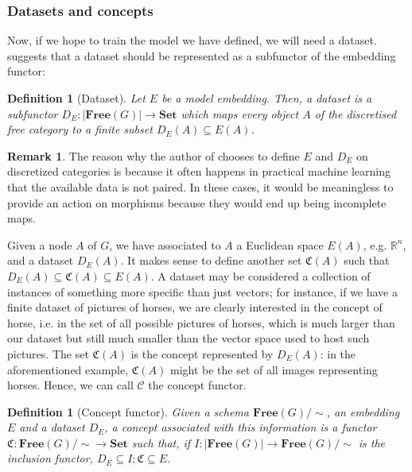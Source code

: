 \documentclass[12pt,a4paper,openright,twoside]{report}
\theoremstyle{plain}
\newtheorem{definition}[proposition]{Definition}
\theoremstyle{definition}
\newtheorem{remark}[proposition]{Remark}
\begin{document}
\subsubsection{Datasets and concepts}

Now, if we hope to train the model we have defined, we will need a dataset. \cite{gavranovic2019compositional} suggests that a dataset should be represented as a subfunctor of the embedding functor:

\begin{definition}[Dataset]
  Let $E$ be a model embedding. Then, a dataset is a subfunctor $D_E: |\mathbf{Free}(G)| \to \mathbf{Set}$ which maps every object $A$ of the discretised free category to a finite subset $D_E(A) \subseteq E(A)$.
\end{definition}

\begin{remark}
  The reason why the author of \cite{gavranovic2019compositional} chooses to define $E$ and $D_E$ on discretized categories is because it often happens in practical machine learning that the available data is not paired. In these cases, it would be meaningless to provide an action on morphisms because they would end up being incomplete maps.
\end{remark}

Given a node $A$ of $G$, we have associated to $A$ a Euclidean space $E(A)$, e.g. $\mathbb{R}^n$, and a dataset $D_E(A)$. It makes sense to define another set $\mathfrak{C}(A)$ such that $D_E(A) \subseteq \mathfrak{C}(A) \subseteq E(A)$. A dataset may be considered a collection of instances of something more specific than just vectors; for instance, if we have a finite dataset of pictures of horses, we are clearly interested in the concept of horse, i.e. in the set of all possible pictures of horses, which is much larger than our dataset but still much smaller than the vector space used to host such pictures. The set $\mathfrak{C}(A)$ is the concept represented by $D_E(A)$: in the aforementioned example, $\mathfrak{C}(A)$ might be the set of all images representing horses. Hence, we can call $\mathcal{C}$ the concept functor. 

\begin{definition}[Concept functor]
  Given a schema $\mathbf{Free}(G)/{\sim}$, an embedding $E$ and a dataset $D_E$, a concept associated with this information is a functor $\mathfrak{C}: \mathbf{Free}(G)/{\sim} \to \mathbf{Set}$ such that, if $I: |\mathbf{Free}(G)| \to \mathbf{Free}(G)/{\sim}$ is the inclusion functor, $D_E \subseteq I;\mathfrak{C} \subseteq E$.
\end{definition}
\end{document}
